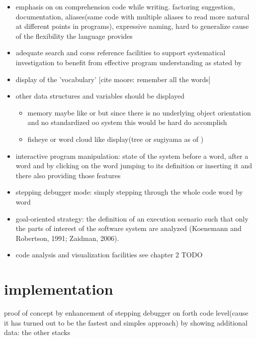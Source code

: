 \begin{itemize}

\item emphasis on on comprehension code while writing. factoring suggestion, documentation, aliases(same code with multiple aliases to read more natural at different points in programs),  expressive naming, hard to generalize cause of the flexibility the language provides

\item adequate search and corss reference facilities to support systematical investigation to benefit from effective program understanding as stated by \cite{Robillard:2004:EDI:1042203.1042417}

\item display of the 'vocabulary' [cite moore: remember all the words]

\item other data structures and variables should be displayed
	\begin{itemize}
	\item memory maybe like \cite{ReissProgrammingEnvironments1995} or \cite{Aftandilian:2010:HIH:1879211.1879222} but since there is no underlying object orientation and no standardized oo system this would be hard do accomplish
	\item fisheye or word cloud like display(tree or sugiyama as of \cite{Storey:1997:IVT:857188.857642})
	\end{itemize}
	
\item interactive program manipulation: state of the system before a word, after a word and by clicking on the word jumping to its definition or inserting it and there also providing those features

\item stepping debugger mode: simply stepping through the whole code word by word

\item goal-oriented strategy: the definition of an execution scenario such that only the parts of interest of the software system are analyzed (Koenemann and Robertson, 1991; Zaidman,
2006).

\item code analysis and visualization facilities see chapter 2 TODO

\end{itemize}
	
\section{implementation}

proof of concept by enhancement of stepping debugger on forth code level(cause it has turned out to be the fastest and simples approach) by showing additional data: the other stacks
